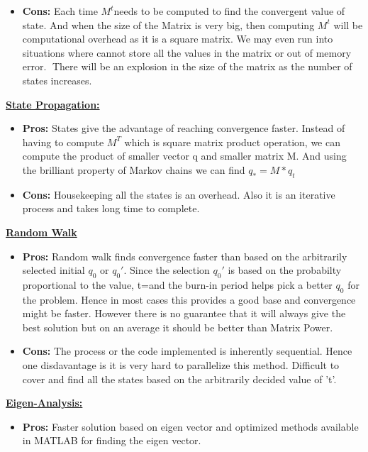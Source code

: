 \documentclass[11pt]{article}
\begin{document}
\begin{itemize}
\begin{itemize}
\item[] \textbf{Cons:} Each time $M^t$needs to be computed to find the convergent value of state. And when the size of the Matrix is very big, then computing $M^t$ will be computational overhead as it is a square matrix. We may even run into situations where cannot store all the values in the matrix or out of memory error. There will be an explosion in the size of the matrix as the number of states increases.
\end{itemize}

\textbf{\underline{State Propagation:}}
\begin{itemize}
	\item[] \textbf{Pros:} States give the advantage of reaching convergence faster. Instead of having to compute $M^T$ which is square matrix product operation, we can compute the product of smaller vector q and smaller matrix M. And using the brilliant property of Markov chains we can find $q_
	*= M * q_t $
\item[] \textbf{Cons:} Housekeeping all the states is an overhead. Also it is an iterative process and takes long time to complete.

\end{itemize}

\newpage 
\textbf{\underline{Random Walk}}
\begin{itemize}

\item[] \textbf{Pros:} Random walk finds convergence faster than based on the arbitrarily selected initial $q_0$ or $q_0'$. Since the selection $q_0'$ is based on the probabilty proportional to the value, t=and the burn-in period helps pick a better $q_0$ for the problem. Hence in most cases this provides a good base and convergence might be faster. However there is no guarantee that it will always give the best solution but on an average it should be better than Matrix Power.

\item[] \textbf{Cons:} The process or the code implemented is inherently sequential. Hence one disdavantage is it is very hard to parallelize this method. Difficult to cover and find all the states based on the arbitrarily decided value of 't'.

\end{itemize}

\textbf{\underline{Eigen-Analysis:}}
\begin{itemize}
	\item[] \textbf{Pros:} Faster solution based on eigen vector and optimized methods available in MATLAB for finding the eigen vector.
	

\end{itemize}
\end{itemize}
\end{document}
